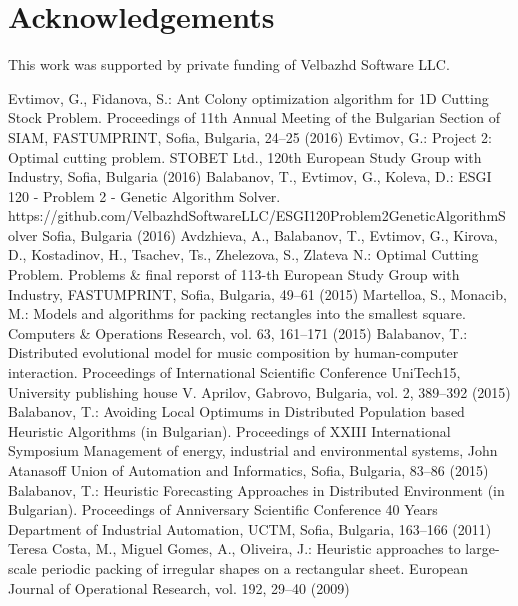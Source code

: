 \documentclass{llncs}
\begin{document}
\section*{Acknowledgements}
%
%
This work was supported by private funding of Velbazhd Software LLC.
%
%
\begin{thebibliography}{}
%
Evtimov, G., Fidanova, S.:
Ant Colony optimization algorithm for 1D Cutting Stock Problem.
Proceedings of 11th Annual Meeting of the Bulgarian Section of SIAM, FASTUMPRINT, Sofia, Bulgaria, 24--25 (2016)
%
Evtimov, G.:
Project 2: Optimal cutting problem.
STOBET Ltd., 120th European Study Group with Industry, Sofia, Bulgaria  (2016)
%
Balabanov, T., Evtimov, G., Koleva, D.:
ESGI 120 - Problem 2 - Genetic Algorithm Solver.
https://github.com/VelbazhdSoftwareLLC/ESGI120Problem2GeneticAlgorithmSolver Sofia, Bulgaria  (2016)
%
Avdzhieva, A., Balabanov, T., Evtimov, G., Kirova, D., Kostadinov, H., Tsachev, Ts., Zhelezova, S., Zlateva N.:
Optimal Cutting Problem.
Problems \& final reporst of 113-th European Study Group with Industry, FASTUMPRINT, Sofia, Bulgaria, 49--61 (2015)
%
Martelloa, S., Monacib, M.:
Models and algorithms for packing rectangles into the smallest square.
Computers \& Operations Research, vol. 63, 161--171 (2015)
%
Balabanov, T.:
Distributed evolutional model for music composition by human-computer interaction.
Proceedings of International Scientific Conference UniTech15, University publishing house V. Aprilov, Gabrovo, Bulgaria, vol. 2, 389--392 (2015)
%
Balabanov, T.:
Avoiding Local Optimums in Distributed Population based Heuristic Algorithms (in Bulgarian).
Proceedings of XXIII International Symposium Management of energy, industrial and environmental systems, John Atanasoff Union of Automation and Informatics, Sofia, Bulgaria, 83--86 (2015)
%
Balabanov, T.:
Heuristic Forecasting Approaches in Distributed Environment (in Bulgarian).
Proceedings of Anniversary Scientific Conference 40 Years Department of Industrial Automation, UCTM, Sofia, Bulgaria, 163--166 (2011)
%
\bibitem {}
Teresa Costa, M.,  Miguel Gomes, A., Oliveira, J.:
Heuristic approaches to large-scale periodic packing of irregular shapes on a rectangular sheet.
European Journal of Operational Research, vol. 192, 29--40 (2009)
%
\end{thebibliography}
\end{document}
